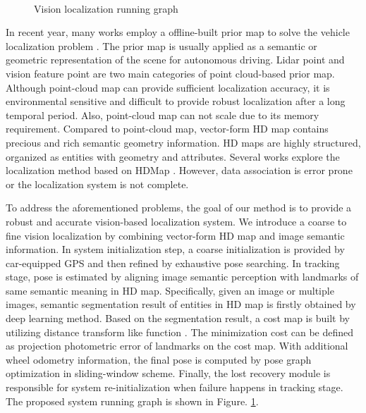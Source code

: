 \documentclass[letterpaper, 10 pt, conference]{ieeeconf}
\newcommand{\hlr}[1]{{\color{red}{#1}}}
\begin{document}
\begin{figure}[htb]
  \\
  \caption{Vision localization running graph} 
  \label{figure:localization in hdmap}
\end{figure}

In recent year, many works employ a offline-built prior map to solve the vehicle localization problem \cite{2020AVP} \cite{choi2020lane} \cite{paulsmonocular}. The prior map is usually applied as a semantic or geometric representation of the scene for autonomous driving. Lidar point \cite{zhang2014loam} and vision feature point \cite{mur2017orb} are two main categories of point cloud-based prior map. Although point-cloud map can provide sufficient localization accuracy, it is environmental sensitive and difficult to provide robust localization after a long temporal period. Also, point-cloud map can not scale due to its memory requirement. Compared to point-cloud map, vector-form HD map contains precious and rich semantic geometry information. HD maps are highly structured, organized as entities with geometry and attributes. Several works explore the localization method based on HDMap \cite{choi2020lane, paulsmonocular, xiao2020monocular}. However, data association is error prone or the localization system is not complete.


To address the aforementioned problems, the goal of our method is to provide a robust and accurate vision-based localization system. %
We introduce a coarse to fine vision localization by combining vector-form HD map and image semantic information. In system initialization step, a coarse initialization is provided by car-equipped GPS and then refined by exhaustive pose searching. 
In tracking stage, pose is estimated by aligning image semantic perception with landmarks of same semantic meaning in HD map. Specifically, given an image or multiple images, semantic segmentation result of entities in HD map is firstly obtained by deep learning method. Based on the segmentation result, a cost map is built by utilizing distance transform like function \cite{breu1995linear}. The minimization cost can be defined as projection photometric error of landmarks on the cost map. With additional wheel odometry information, the final pose is computed by pose graph optimization in sliding-window scheme. Finally, the lost recovery module is responsible for system re-initialization when failure happens in tracking stage. The proposed system running graph is shown in Figure. \ref{figure:localization in hdmap}.
\end{document}
